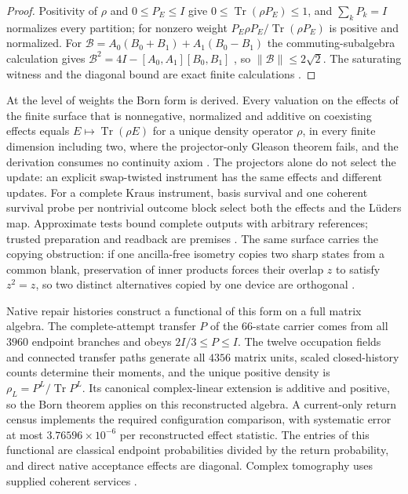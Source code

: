 \documentclass[11pt]{article}
\theoremstyle{definition}
\theoremstyle{remark}
\begin{document}
\begin{proof}
Positivity of $\rho$ and $0\le P_E\le I$ give $0\le\operatorname{Tr}(\rho
P_E)\le1$, and $\sum_kP_k=I$ normalizes every partition; for nonzero weight
$P_E\rho P_E/\operatorname{Tr}(\rho P_E)$ is positive and normalized. For
$\mathcal B=A_0(B_0+B_1)+A_1(B_0-B_1)$ the commuting-subalgebra calculation
gives $\mathcal B^2=4I-[A_0,A_1][B_0,B_1]$ \cite{landau1987}, so $\|\mathcal B\|\le2\sqrt2$.
The saturating witness and the diagonal bound are exact finite calculations
\cite{opheventalgebra}.
\end{proof}

At the level of weights the Born form is derived. Every valuation on the
effects of the finite surface that is nonnegative, normalized and additive on
coexisting effects equals $E\mapsto\operatorname{Tr}(\rho E)$ for a unique
density operator $\rho$, in every finite dimension including two, where the
projector-only Gleason theorem fails, and the derivation consumes no continuity axiom \cite{gleason1957,busch2003}. The projectors alone do not select the update: an explicit swap-twisted instrument has the same effects and different updates.
For a complete Kraus instrument, basis survival and one coherent survival
probe per nontrivial outcome block select both the effects and the L\"uders
map. Approximate tests bound complete outputs with arbitrary references;
trusted preparation and readback are premises
\cite{luders1950,opheventalgebra}. The same surface carries the copying
obstruction: if one ancilla-free isometry copies two sharp states from a
common blank, preservation of inner products forces their overlap $z$ to
satisfy $z^2=z$, so two distinct alternatives copied by one device are orthogonal \cite{wootterszurek1982,dieks1982}.

Native repair histories construct a functional of this form on a full matrix
algebra. The complete-attempt transfer $P$ of the $66$-state carrier comes from
all $3960$ endpoint branches and obeys $2I/3\leq P\leq I$. The twelve occupation
fields and connected transfer paths generate all $4356$ matrix units, scaled
closed-history counts determine their moments, and the unique positive density
is $\rho_L=P^L/\operatorname{Tr}P^L$. Its canonical complex-linear extension is
additive and positive, so the Born theorem applies on this reconstructed algebra.
A current-only return census implements the required configuration comparison,
with systematic error at most $3.76596\times10^{-6}$ per reconstructed effect
statistic. The entries of this functional are classical endpoint probabilities
divided by the return probability, and direct native acceptance effects are
diagonal. Complex tomography uses supplied coherent services
\cite{opheventalgebra,ophobservers}.
\end{document}
